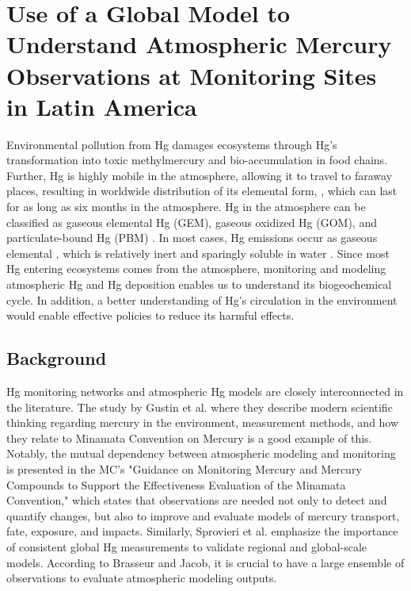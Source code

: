 \chapter{Use of a Global Model to Understand Atmospheric Mercury Observations at Monitoring Sites in Latin America }\label{chapter2}
\begin{flushleft}
Environmental pollution from Hg damages ecosystems through Hg's transformation into toxic methylmercury and bio-accumulation in food chains. Further, Hg is highly mobile in the atmosphere, allowing it to travel to faraway places, resulting in worldwide distribution of its elemental form, \hg, which can last for as long as six months in the atmosphere\cite{horowitz_new_2017,shah_improved_2021}. Hg in the atmosphere can be classified as gaseous elemental Hg (GEM), gaseous oxidized Hg (GOM), and particulate-bound Hg (PBM)  \cite{lindberg_synthesis_2007,schroeder_atmospheric_1998,landis_development_2002}. In most cases, Hg emissions occur as gaseous elemental \hg, which is relatively inert and sparingly soluble in water \cite{horowitz_new_2017}. Since most Hg entering ecosystems comes from the atmosphere, monitoring and modeling atmospheric Hg and Hg deposition enables us to understand its biogeochemical cycle. In addition, a better understanding of Hg's circulation in the environment would enable effective policies to reduce its harmful effects.
\end{flushleft}
\section{Background}\label{chapter2_background}
\begin{flushleft}

Hg monitoring networks and atmospheric Hg models are closely interconnected in the literature. The study by Gustin et al.\cite{gustin_mercury_2020} where they describe modern scientific thinking regarding mercury in the environment, measurement methods, and how they relate to Minamata Convention on Mercury is a good example of this. Notably, the mutual dependency between atmospheric modeling and monitoring is presented in the MC's "Guidance on Monitoring Mercury and Mercury Compounds to Support the Effectiveness Evaluation of the Minamata Convention," which states that observations are needed not only to detect and quantify changes, but also to improve and evaluate models of mercury transport, fate, exposure, and impacts\cite{unep_guidance_2021}. Similarly, Sprovieri et al.\cite{sprovieri_atmospheric_2016} emphasize the importance of consistent global Hg measurements to validate regional and global-scale models.  According to Brasseur and Jacob\cite{brasseur_modeling_2017}, it is crucial to have a large ensemble of observations to evaluate atmospheric modeling outputs.
\end{flushleft}

